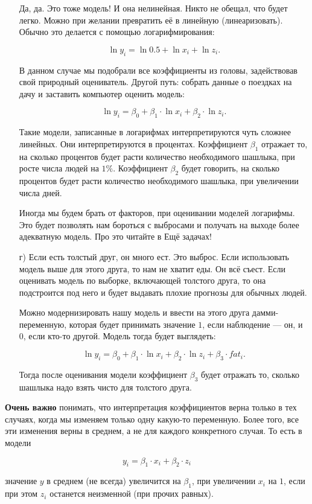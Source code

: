 \documentclass[12pt, a4paper, oneside]{article}
\theoremstyle{plain} %
\theoremstyle{definition}
\begin{document}
\begin{solution}
\begin{enumerate}
		Да, да. Это тоже модель! И она нелинейная. Никто не обещал, что будет легко. Можно при желании превратить её в линейную (линеаризовать). Обычно это делается с помощью логарифмирования: 
		
		\[ \ln y_i = \ln 0.5 + \ln x_i + \ln z_i.\]
		
		В данном случае мы подобрали все коэффициенты из головы, задействовав свой природный оцениватель. Другой путь: собрать данные о поездках на дачу и заставить компьютер оценить модель: 
		
		\[ \ln y_i = \beta_0 + \beta_1 \cdot \ln x_i + \beta_2 \cdot \ln z_i.\]
		
		Такие модели, записанные в логарифмах интерпретируются чуть сложнее линейных. Они интерпретируются в процентах. Коэффициент $\beta_1$ отражает то, на сколько процентов будет расти количество необходимого шашлыка, при росте числа людей на $1\%$. Коэффициент $\beta_2$ будет говорить, на сколько процентов будет расти количество необходимого шашлыка, при увеличении числа дней.
		
		Иногда мы будем брать от факторов, при оценивании моделей логарифмы. Это будет позволять нам бороться с выбросами и получать на выходе более адекватную модель. Про это читайте в Ещё задачах! 
		
		\item[г)]   Если есть толстый друг, он много ест. Это выброс. Если использовать модель выше для этого друга, то нам не хватит еды. Он всё съест. Если оценивать модель по выборке, включающей толстого друга, то она подстроится под него и будет выдавать плохие прогнозы для обычных людей. 
		
		Можно модернизировать нашу модель и ввести на этого друга дамми-переменную, которая будет принимать значение $1$, если наблюдение --- он, и $0$, если кто-то другой. Модель тогда будет выглядеть: 
		
		\[ \ln y_i = \beta_0 + \beta_1 \cdot \ln x_i + \beta_2 \cdot \ln z_i + \beta_3 \cdot fat_i.\]
		
		Тогда после оценивания модели коэффициент $\beta_3$ будет отражать то, сколько шашлыка надо взять чисто для толстого друга.
		

	\end{enumerate}	
	
	\textbf{Очень важно} понимать, что интерпретация коэффициентов верна только в тех случаях, когда мы изменяем только одну какую-то переменную. Более того, все эти изменения верны в среднем, а не для каждого конкретного случая. То есть в модели 
	
	\[ y_i = \beta_1 \cdot  x_i + \beta_2 \cdot  z_i \]
	
	значение $y$ в среднем (не всегда) увеличится на $\beta_1$, при увеличении $x_i$ на $1$, если при этом $z_i$ останется неизменной (при прочих равных).
\end{solution}
\end{document}
